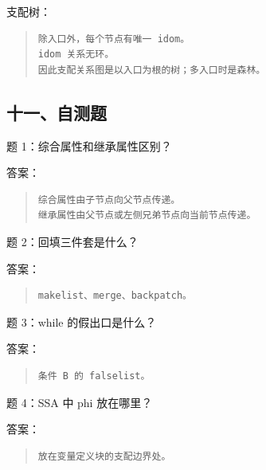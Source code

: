 \documentclass[UTF8,zihao=-4]{ctexart}
\begin{document}
支配树：


\begin{quote}
\footnotesize
\begin{verbatim}
除入口外，每个节点有唯一 idom。
idom 关系无环。
因此支配关系图是以入口为根的树；多入口时是森林。
\end{verbatim}
\end{quote}


\subsection{十一、自测题}


题 1：综合属性和继承属性区别？


答案：


\begin{quote}
\footnotesize
\begin{verbatim}
综合属性由子节点向父节点传递。
继承属性由父节点或左侧兄弟节点向当前节点传递。
\end{verbatim}
\end{quote}


题 2：回填三件套是什么？


答案：


\begin{quote}
\footnotesize
\begin{verbatim}
makelist、merge、backpatch。
\end{verbatim}
\end{quote}


题 3：while 的假出口是什么？


答案：


\begin{quote}
\footnotesize
\begin{verbatim}
条件 B 的 falselist。
\end{verbatim}
\end{quote}


题 4：SSA 中 phi 放在哪里？


答案：


\begin{quote}
\footnotesize
\begin{verbatim}
放在变量定义块的支配边界处。
\end{verbatim}
\end{quote}
\end{document}
